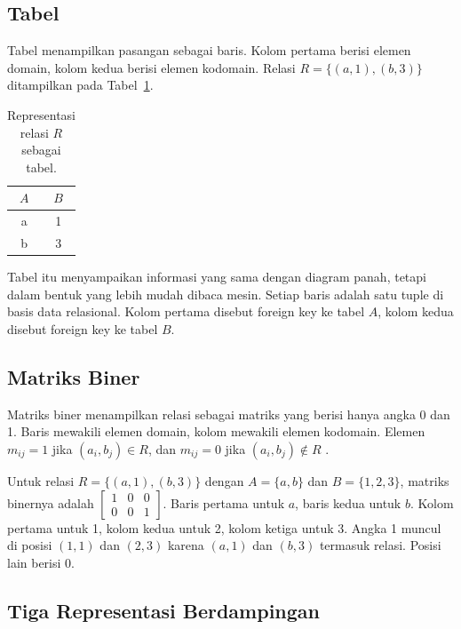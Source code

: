 \documentclass[11pt,a4paper]{article}
\begin{document}
\subsection{Tabel}

Tabel menampilkan pasangan sebagai baris. Kolom pertama berisi elemen domain, kolom kedua berisi elemen kodomain. Relasi $R=\{(a,1),(b,3)\}$ ditampilkan pada Tabel~\ref{tab:relasi-tabel}.

\begin{table}[H]
	\centering
	\caption{Representasi relasi $R$ sebagai tabel.}
	\label{tab:relasi-tabel}
	\small
	\begin{tabular}{c c}
		\toprule
		$A$ & $B$ \\
		\midrule
		a   & 1   \\
		b   & 3   \\
		\bottomrule
	\end{tabular}
\end{table}

Tabel itu menyampaikan informasi yang sama dengan diagram panah, tetapi dalam bentuk yang lebih mudah dibaca mesin. Setiap baris adalah satu tuple di basis data relasional. Kolom pertama disebut foreign key ke tabel $A$, kolom kedua disebut foreign key ke tabel $B$.

\subsection{Matriks Biner}

Matriks biner menampilkan relasi sebagai matriks yang berisi hanya angka 0 dan 1. Baris mewakili elemen domain, kolom mewakili elemen kodomain. Elemen $m_{ij}=1$ jika $(a_i,b_j) \in R$, dan $m_{ij}=0$ jika $(a_i,b_j) \notin R$ \cite{rosen}.

Untuk relasi $R=\{(a,1),(b,3)\}$ dengan $A=\{a,b\}$ dan $B=\{1,2,3\}$, matriks binernya adalah $\begin{bmatrix}1&0&0\\0&0&1\end{bmatrix}$. Baris pertama untuk $a$, baris kedua untuk $b$. Kolom pertama untuk 1, kolom kedua untuk 2, kolom ketiga untuk 3. Angka 1 muncul di posisi $(1,1)$ dan $(2,3)$ karena $(a,1)$ dan $(b,3)$ termasuk relasi. Posisi lain berisi 0.

\subsection{Tiga Representasi Berdampingan}
\end{document}
